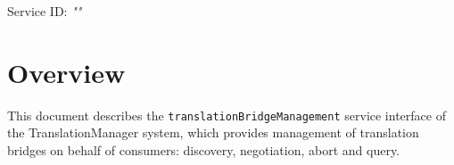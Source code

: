 \documentclass[a4paper]{arrowhead}
\begin{document}
\sloppy

\ArrowheadSetup

\begin{center}
  \vspace*{1cm}
  \huge{\arrowtitle}

  \vspace*{0.2cm}
  \LARGE{\arrowtype}
  \vspace*{1cm}

  \Large{Service ID: \textit{"\arrowid"}}

  \vspace*{\fill}


  \vspace*{1cm}
  \vspace*{\fill}

  \begin{abstract}
    This document describes the HTTP/1.1 protocol with TLS payload security and JSON payload encoding variant of the \texttt{translation\allowbreak{}Bridge\allowbreak{}Management} service of the TranslationManager system.
  \end{abstract}

  \vspace*{1cm}
\end{center}

\newpage

\tableofcontents
\newpage

\section{Overview}
\label{sec:overview}

This document describes the \texttt{translation\allowbreak{}Bridge\allowbreak{}Management} service interface of the TranslationManager system, which provides management of translation bridges on behalf of consumers: discovery, negotiation, abort and query.
\end{document}
